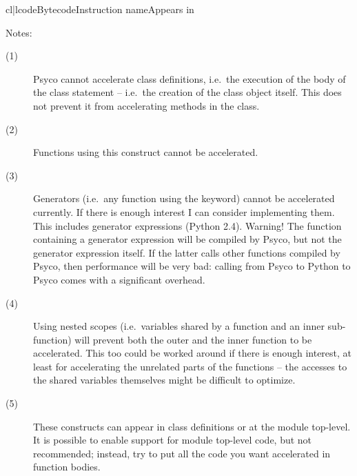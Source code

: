 \documentclass{manual}
\begin{document}
\begin{tableiii}{cl|l}{code}{Bytecode}{Instruction name}{Appears in}
\end{tableiii}

\noindent
Notes:
%
\begin{description}
\item[(1)]
  Psyco cannot accelerate class definitions, i.e.\ the execution of the body of the class statement -- i.e.\ the creation of the class object itself.  This does not prevent it from accelerating methods in the class.
\item[(2)]
  Functions using this construct cannot be accelerated.
\item[(3)]
  Generators (i.e.\ any function using the  keyword) cannot be accelerated currently.  If there is enough interest I can consider implementing them.  This includes generator expressions (Python 2.4).  Warning!  The function containing a generator expression will be compiled by Psyco, but not the generator expression itself.  If the latter calls other functions compiled by Psyco, then performance will be very bad: calling from Psyco to Python to Psyco comes with a significant overhead.
\item[(4)]
  Using nested scopes (i.e.\ variables shared by a function and an inner sub-function) will prevent both the outer and the inner function to be accelerated.  This too could be worked around if there is enough interest, at least for accelerating the unrelated parts of the functions -- the accesses to the shared variables themselves might be difficult to optimize.
\item[(5)]
  These constructs can appear in class definitions or at the module top-level.  It is possible to enable support for module top-level code, but not recommended; instead, try to put all the code you want accelerated in function bodies.
\end{description}
\end{document}
